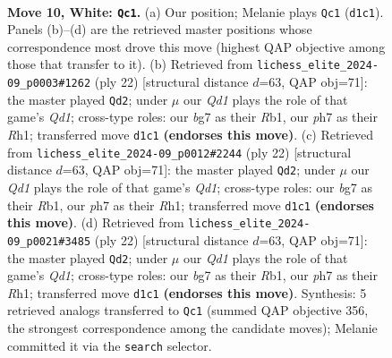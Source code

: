 \documentclass[11pt]{article}
\begin{document}
\clearpage

\begin{figure}[p]\centering
\begin{subfigure}{0.46\textwidth}\centering
\resizebox{\linewidth}{!}{%
\newchessgame
\chessboard[
  setfen={rnbqr1k1/pp2ppbp/6p1/2pP2B1/4P3/2P5/P2K1PPP/R2Q1BNR w - - 1 10},
  showmover=false,
  pgfstyle=straightmove, color=movearrow, markmove={d1-c1}
]}
\caption{}
\end{subfigure}\hfill
\begin{subfigure}{0.46\textwidth}\centering
\resizebox{\linewidth}{!}{%
\newchessgame
\chessboard[
  setfen={r1bq1rk1/pp2pp1p/6p1/2pPb3/4P3/2P5/P3BPPP/1RBQK2R w K - 0 12},
  showmover=false,
  pgfstyle=straightmove, color=movearrow, markmove={d1-d2}
]}
\caption{}
\end{subfigure}
\\[4pt]
\begin{subfigure}{0.46\textwidth}\centering
\resizebox{\linewidth}{!}{%
\newchessgame
\chessboard[
  setfen={r1bq1rk1/pp2pp1p/6p1/2pPb3/4P3/2P5/P3BPPP/1RBQK2R w K - 0 12},
  showmover=false,
  pgfstyle=straightmove, color=movearrow, markmove={d1-d2}
]}
\caption{}
\end{subfigure}\hfill
\begin{subfigure}{0.46\textwidth}\centering
\resizebox{\linewidth}{!}{%
\newchessgame
\chessboard[
  setfen={r1bq1rk1/pp2pp1p/6p1/2pPb3/4P3/2P5/P3BPPP/1RBQK2R w K - 0 12},
  showmover=false,
  pgfstyle=straightmove, color=movearrow, markmove={d1-d2}
]}
\caption{}
\end{subfigure}
\caption{\textbf{Move 10, White: \texttt{Qc1}.} (a) Our position; Melanie plays \texttt{Qc1} (\texttt{d1c1}). Panels (b)--(d) are the retrieved master positions whose correspondence most drove this move (highest QAP objective among those that transfer to it). (b) Retrieved from \texttt{lichess\_elite\_2024-09\_p0003\#1262} (ply 22) [structural distance $d$=63, QAP obj=71]: the master played \texttt{Qd2}; under $\mu$ our \emph{Qd1} plays the role of that game's \emph{Qd1}; cross-type roles: our \emph{b}g7 as their \emph{R}b1, our \emph{p}h7 as their \emph{R}h1; transferred move \texttt{d1c1} \textbf{(endorses this move)}. (c) Retrieved from \texttt{lichess\_elite\_2024-09\_p0012\#2244} (ply 22) [structural distance $d$=63, QAP obj=71]: the master played \texttt{Qd2}; under $\mu$ our \emph{Qd1} plays the role of that game's \emph{Qd1}; cross-type roles: our \emph{b}g7 as their \emph{R}b1, our \emph{p}h7 as their \emph{R}h1; transferred move \texttt{d1c1} \textbf{(endorses this move)}. (d) Retrieved from \texttt{lichess\_elite\_2024-09\_p0021\#3485} (ply 22) [structural distance $d$=63, QAP obj=71]: the master played \texttt{Qd2}; under $\mu$ our \emph{Qd1} plays the role of that game's \emph{Qd1}; cross-type roles: our \emph{b}g7 as their \emph{R}b1, our \emph{p}h7 as their \emph{R}h1; transferred move \texttt{d1c1} \textbf{(endorses this move)}. Synthesis: 5 retrieved analogs transferred to \texttt{Qc1} (summed QAP objective 356, the strongest correspondence among the candidate moves); Melanie committed it via the \texttt{search} selector.}
\label{fig:thought-m18}
\end{figure}
\end{document}
